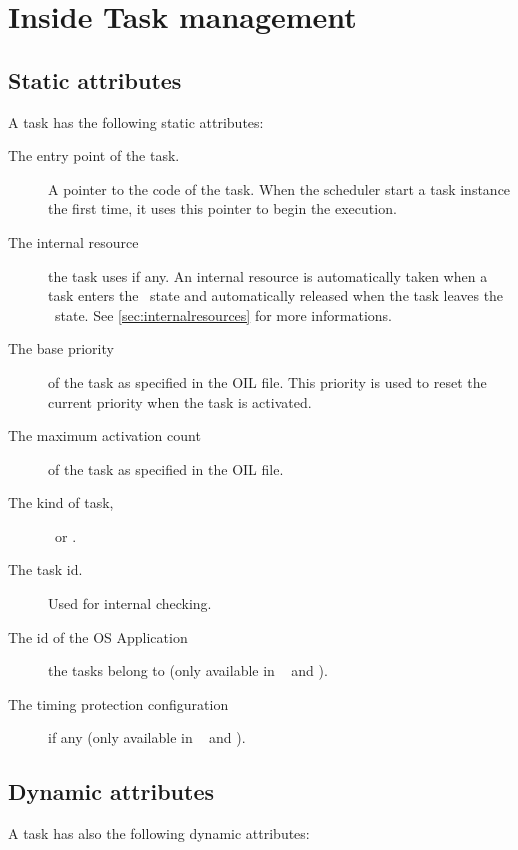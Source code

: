 \section{Inside Task management}
\label{sec:addtaskstate}

\subsection{Static attributes}

A task has the following static attributes:

\begin{description}
\item[The entry point of the task.] A pointer to the code of the task. When the scheduler start a task instance the first time, it uses this pointer to begin the execution.
\item[The internal resource] the task uses if any. An internal resource is automatically taken when a task enters the \RUNNING\ state and automatically released when the task leaves the \RUNNING\ state. See \ref{sec:internalresources} for more informations.
\item[The base priority] of the task as specified in the OIL file. This priority is used to reset the current priority when the task is activated.
\item[The maximum activation count] of the task as specified in the OIL file.
\item[The kind of task,] \BASIC\ or \EXTENDED.
\item[The task id.] Used for internal checking.
\item[The id of the OS Application] the tasks belong to (only available in \autosar\  and ).
\item[The timing protection configuration] if any (only available in \autosar\  and ).
\end{description}

\subsection{Dynamic attributes}

A task has also the following dynamic attributes:

